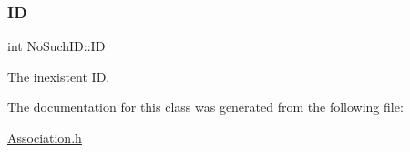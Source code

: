 \subsubsection{\texorpdfstring{ID}{ID}}
{\footnotesize\ttfamily int No\+Such\+I\+D\+::\+ID\hspace{0.3cm}{\ttfamily [private]}}



The inexistent ID. 



The documentation for this class was generated from the following file\+:\begin{DoxyCompactItemize}
\item 
\hyperlink{Association_8h}{Association.\+h}\end{DoxyCompactItemize}
